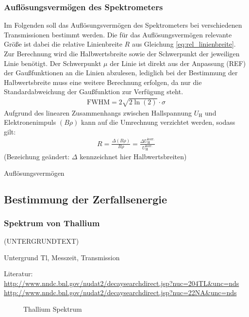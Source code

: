 \documentclass[11pt, a4paper]{article}
\numberwithin{equation}{section}
\begin{document}
\subsubsection{Auflösungsvermögen des Spektrometers}
Im Folgenden soll das Auflösungsvermögen des Spektrometers bei verschiedenen Transmissionen bestimmt werden.
Die für das Auflösungsvermögen relevante Größe ist dabei die relative Linienbreite $R$ aus Gleichung \eqref{eq:rel_linienbreite}.
Zur Berechnung wird die Halbwertsbreite sowie der Schwerpunkt der jeweiligen Linie benötigt.
Der Schwerpunkt $\mu$ der Linie ist direkt aus der Anpassung (REF) der Gaußfunktionen an die Linien abzulesen, lediglich bei der Bestimmung der Halbwertsbreite muss eine weitere Berechnung erfolgen, da nur die Standardabweichung der Gaußfunktion zur Verfügung steht.
\begin{align}
	\mathrm{FWHM} = 2 \sqrt{2\ln(2)} \cdot \sigma
\end{align}
Aufgrund des linearen Zusammenhangs zwischen Hallspannung $U_\mathrm{H}$ und Elektronenimpuls $(B \rho)$ kann auf die Umrechnung verzichtet werden, sodass gilt:
\begin{align*}
	R = \frac{\Delta (B \rho)}{B \rho} = \frac{\Delta U_\mathrm{H}^\mathrm{korr.}}{U_\mathrm{H}^\mathrm{korr.}}
\end{align*}
(Bezeichung geändert: $\Delta$ kennzeichnet hier Halbwertsbreiten)

\begin{table}[h]
	\centering
	
	\caption{Auflösungsvermögen}
	\label{tab:aufloesungsvermoegen}
\end{table}

\subsection{Bestimmung der Zerfallsenergie}

\subsubsection{Spektrum von Thallium}
(UNTERGRUNDTEXT)
\begin{table}[h]
	\centering
	
	\caption{Untergrund Tl, Messzeit, Transmission}
	\label{tab:untergrund_tl}
\end{table}

Literatur:\\
\url{http://www.nndc.bnl.gov/nudat2/decaysearchdirect.jsp?nuc=204TL&unc=nds}\\
\url{http://www.nndc.bnl.gov/nudat2/decaysearchdirect.jsp?nuc=22NA&unc=nds}
\begin{figure}[h]
	\centering
	
	\caption{Thallium Spektrum}
	\label{fig:thallium_spectrum}
\end{figure}
\end{document}
